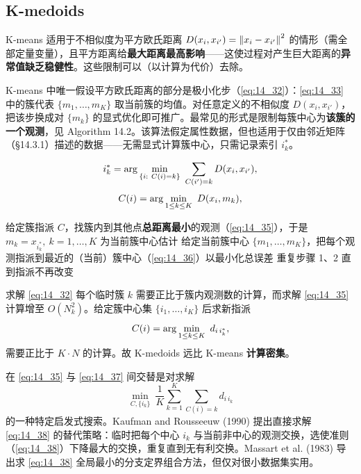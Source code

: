 \subsection{K-medoids}

K-means 适用于不相似度为平方欧氏距离 $D(x_i,x_{i'})=\left\lVert x_i-x_{i'}\right\rVert^2$ 的情形（需全部定量变量），且平方距离给\textbf{最大距离最高影响}——这使过程对产生巨大距离的\textbf{异常值缺乏稳健性}。这些限制可以（以计算为代价）去除。

K-means 中唯一假设平方欧氏距离的部分是极小化步（\eqref{eq:14_32}）：\eqref{eq:14_33} 中的簇代表 $\{m_1,\dots,m_K\}$ 取当前簇的均值。对任意定义的不相似度 $D(x_i,x_{i'})$，把该步换成对 $\{m_k\}$ 的显式优化即可推广。最常见的形式是限制每簇中心为\textbf{该簇的一个观测}，见 Algorithm 14.2。该算法假定属性数据，但也适用于仅由邻近矩阵（§14.3.1）描述的数据——无需显式计算簇中心，只需记录索引 $i_k^*$。

\begin{equation}
i_k^* = \argmin_{\{i:\ C(i)=k\}}\ \sum_{C(i')=k} D(x_i,x_{i'}), \label{eq:14_35}
\end{equation}
\begin{equation}
C(i) = \arg\min_{1\le k\le K}\ D(x_i, m_k), \label{eq:14_36}
\end{equation}

\begin{algorithm}[H]
\caption{K-medoids 聚类（Algorithm 14.2）}
\begin{algorithmic}[1]
\State 给定簇指派 $C$，找簇内到其他点\textbf{总距离最小}的观测（\eqref{eq:14_35}），于是 $m_k=x_{i_k^*},\ k=1,\dots,K$ 为当前簇中心估计
\State 给定当前簇中心 $\{m_1,\dots,m_K\}$，把每个观测指派到最近的（当前）簇中心（\eqref{eq:14_36}）以最小化总误差
\State 重复步骤 1、2 直到指派不再改变
\end{algorithmic}
\end{algorithm}

求解 \eqref{eq:14_32} 每个临时簇 $k$ 需要正比于簇内观测数的计算，而求解 \eqref{eq:14_35} 计算增至 $O(N_k^2)$。给定簇中心集 $\{i_1,\dots,i_K\}$ 后求新指派
\begin{equation}
C(i) = \argmin_{1\le k\le K}\ d_{i\,i_k^*}, \label{eq:14_37}
\end{equation}
需要正比于 $K\cdot N$ 的计算。故 K-medoids 远比 K-means \textbf{计算密集}。

在 \eqref{eq:14_35} 与 \eqref{eq:14_37} 间交替是对求解
\begin{equation}
\min_{C,\{i_k\}}\ \frac{1}{K}\sum_{k=1}^{K}\sum_{C(i)=k} d_{i\,i_k} \label{eq:14_38}
\end{equation}
的一种特定启发式搜索。Kaufman and Rousseeuw (1990) 提出直接求解 \eqref{eq:14_38} 的替代策略：临时把每个中心 $i_k$ 与当前非中心的观测交换，选使准则（\eqref{eq:14_38}）下降最大的交换，重复直到无有利交换。Massart et al. (1983) 导出求 \eqref{eq:14_38} 全局最小的分支定界组合方法，但仅对很小数据集实用。

